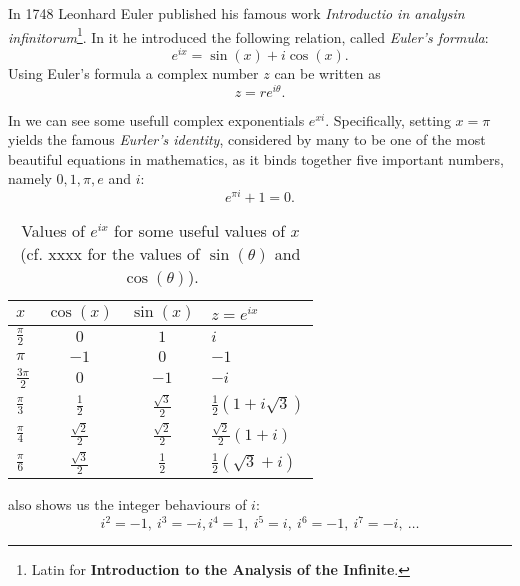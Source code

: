 In 1748 Leonhard Euler published his famous work \textit{Introductio in analysin infinitorum}\footnote{Latin for \textbf{Introduction to the Analysis of the Infinite}.}. In it he introduced the following relation, called \emph{Euler's formula}:
\begin{equation}
	e^{ix} = \sin(x) + i\cos(x).
	\label{eq:Euler's_formula}
\end{equation}
Using Euler's formula a complex number $z$ can be written as
\begin{equation}
	z = re^{i\theta}.
	\label{eq:complex number using Eurler's formula}
\end{equation}

In  we can see some usefull complex exponentials $e^{xi}$. Specifically, setting $x=\pi$ yields the famous \emph{Eurler's identity}, considered by many to be one of the most beautiful equations in mathematics, as it binds together five important numbers, namely $0,1,\pi,e$ and $i$:
\begin{equation}
	e^{\pi i} + 1 = 0.
	\label{eq:Euler's identity}
\end{equation}

\begin{table}
	\centering
	\caption{Values of $e^{ix}$ for some useful values of $x$ (cf. xxxx for the values of $\sin(\theta)$ and $\cos(\theta)$).}
	\label{tab:complex_exponentials}
	\begin{tabular}{lccl}
		\toprule
		$x$ & $\cos(x)$ & $\sin(x)$ & $z=e^{ix}$\\
		\midrule
		$\frac{\pi}{2}$ & $0$ & $1$ & $i$\\
		$\pi$ & $-1$ & $0$ & $-1$\\
		$\frac{3\pi}{2}$ & $0$ & $-1$ & $-i$\\
		$\frac{\pi}{3}$ & $\frac{1}{2}$ & $\frac{\sqrt{3}}{2}$ & $\frac{1}{2}\left( 1+i\sqrt{3} \right)$\\
		$\frac{\pi}{4}$ & $\frac{\sqrt{2}}{2}$ & $\frac{\sqrt{2}}{2}$ & $\frac{\sqrt{2}}{2}\left( 1+i \right)$\\
		$\frac{\pi}{6}$ & $\frac{\sqrt{3}}{2}$ & $\frac{1}{2}$ & $\frac{1}{2}\left( \sqrt{3}+i \right)$\\
		\bottomrule
	\end{tabular}
\end{table}

 also shows us the integer behaviours of $i$:
\begin{equation}
	i^{2}=-1,\ i^{3}=-i, i^{4}=1,\ i^{5}=i,\ i^{6}=-1,\ i^{7}=-i,\ \dots
	\label{eq:powers of i}
\end{equation}

